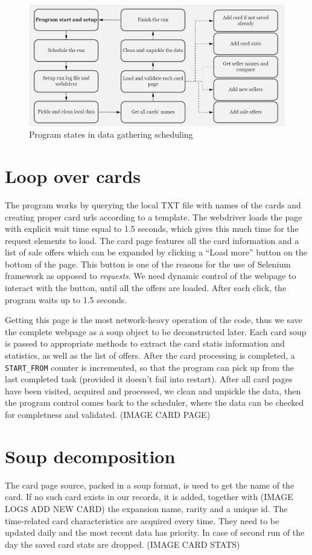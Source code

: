 \begin{figure}[ht]
      \centering
      \includegraphics[width=\textwidth]{figures/gathering_flow.png}
      \caption{Program states in data gathering scheduling}
      \label{fig:gathering_flow}
\end{figure}

\section{Loop over cards}
The program works by querying the local TXT file with names of the cards and creating proper card urls according to a template. The webdriver loads the page with explicit wait time equal to 1.5 seconds, which gives this much time for the request elements to load. The card page features all the card information and a list of sale offers which can be expanded by clicking a ``Load more'' button on the bottom of the page. This button is one of the reasons for the use of Selenium framework as opposed to \textit{requests}. We need dynamic control of the webpage to interact with the button, until all the offers are loaded. After each click, the program waits up to 1.5 seconds. \par Getting this page is the most network-heavy operation of the code, thus we save the complete webpage as a soup object to be deconstructed later. Each card soup is passed to appropriate methods to extract the card statis information and statistics, as well as the list of offers. After the card processing is completed, a \texttt{START\_FROM} counter is incremented, so that the program can pick up from the last completed task (provided it doesn't fail into restart). After all card pages have been visited, acquired and processed, we clean and unpickle the data, then the program control comes back to the scheduler, where the data can be checked for completness and validated. (IMAGE CARD PAGE)

\section{Soup decomposition}
The card page source, packed in a soup format, is used to get the name of the card. If no such card exists in our records, it is added, together with (IMAGE LOGS ADD NEW CARD) the expansion name, rarity and a unique id. The time-related card characteristics are acquired every time. They need to be updated daily and the most recent data has priority. In case of second run of the day the saved card stats are dropped.
(IMAGE CARD STATS)

